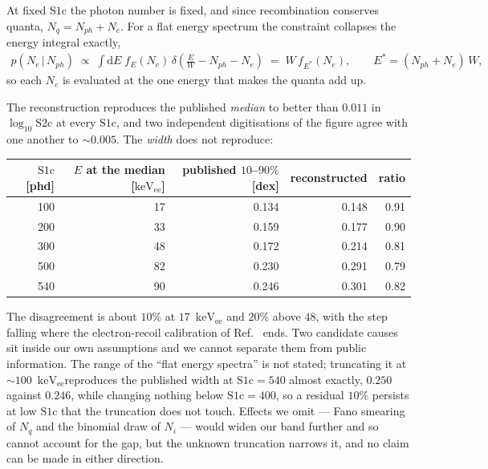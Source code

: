 \documentclass[11pt,a4paper]{article}
\newcommand{\keVee}{\ensuremath{\mathrm{keV_{ee}}}}
\begin{document}
At fixed \(\mathrm{S1c}\) the photon number is fixed, and since
recombination conserves quanta, \(N_q=N_{ph}+N_e\). For a flat energy
spectrum the constraint collapses the energy integral exactly,
\begin{align}
    \label{eq:bandcollapse}
    p(N_e\,|\,N_{ph})\;\propto\;\int\!\mathrm{d}E\;f_E(N_e)\,
    \delta\!\left(\tfrac{E}{W}-N_{ph}-N_e\right)
    \;=\;W\,f_{E^\ast}(N_e),\qquad E^\ast=(N_{ph}+N_e)\,W,
\end{align}
so each \(N_e\) is evaluated at the one energy that makes the quanta add up.

The reconstruction reproduces the published \emph{median} to better than
\(0.011\) in \(\log_{10}\mathrm{S2c}\) at every \(\mathrm{S1c}\), and two
independent digitisations of the figure agree with one another to
\(\sim\!0.005\). The \emph{width} does not reproduce:

\begin{center}
\begin{tabular}{rrrrr}
\toprule
\(\mathrm{S1c}\) [phd] & \(E\) at the median [\keVee] &
published \(10\)--\(90\%\) [dex] & reconstructed & ratio\\
\midrule
100 & 17 & 0.134 & 0.148 & 0.91\\
200 & 33 & 0.159 & 0.177 & 0.90\\
300 & 48 & 0.172 & 0.214 & 0.81\\
500 & 82 & 0.230 & 0.291 & 0.79\\
540 & 90 & 0.246 & 0.301 & 0.82\\
\bottomrule
\end{tabular}
\end{center}

\noindent The disagreement is about \(10\%\) at \(17\)~\keVee
and \(20\%\) above \(48\), with the step falling where the electron-recoil
calibration of Ref.~\cite{WS2024} ends. Two candidate causes sit inside our
own assumptions and we cannot separate them from public information. The
range of the ``flat energy spectra'' is not stated; truncating it at
\(\sim\!100\)~\keVee reproduces the published width at
\(\mathrm{S1c}=540\) almost exactly, \(0.250\) against \(0.246\), while
changing nothing below \(\mathrm{S1c}=400\), so a residual \(10\%\) persists
at low \(\mathrm{S1c}\) that the truncation does not touch. Effects we omit
--- Fano smearing of \(N_q\) and the binomial draw of \(N_i\) --- would widen
our band further and so cannot account for the gap, but the unknown
truncation narrows it, and no claim can be made in either direction.
\end{document}

